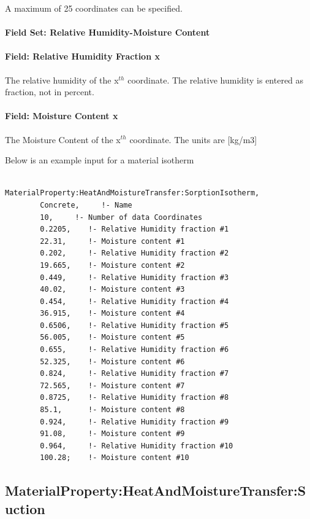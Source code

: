 A maximum of 25 coordinates can be specified.

\paragraph{Field Set: Relative Humidity-Moisture Content}\label{field-set-relative-humidity-moisture-content}

\paragraph{Field: Relative Humidity Fraction x}\label{field-relative-humidity-fraction-x}

The relative humidity of the x\(^{th}\) coordinate. The relative humidity is entered as fraction, not in percent.

\paragraph{Field: Moisture Content x}\label{field-moisture-content-x}

The Moisture Content of the x\(^{th}\) coordinate. The units are {[}kg/m3{]}

Below is an example input for a material isotherm

\begin{lstlisting}

MaterialProperty:HeatAndMoistureTransfer:SorptionIsotherm,
        Concrete,     !- Name
        10,     !- Number of data Coordinates
        0.2205,    !- Relative Humidity fraction #1
        22.31,     !- Moisture content #1
        0.202,     !- Relative Humidity fraction #2
        19.665,    !- Moisture content #2
        0.449,     !- Relative Humidity fraction #3
        40.02,     !- Moisture content #3
        0.454,     !- Relative Humidity fraction #4
        36.915,    !- Moisture content #4
        0.6506,    !- Relative Humidity fraction #5
        56.005,    !- Moisture content #5
        0.655,     !- Relative Humidity fraction #6
        52.325,    !- Moisture content #6
        0.824,     !- Relative Humidity fraction #7
        72.565,    !- Moisture content #7
        0.8725,    !- Relative Humidity fraction #8
        85.1,      !- Moisture content #8
        0.924,     !- Relative Humidity fraction #9
        91.08,     !- Moisture content #9
        0.964,     !- Relative Humidity fraction #10
        100.28;    !- Moisture content #10
\end{lstlisting}

\subsection{MaterialProperty:HeatAndMoistureTransfer:Suction}\label{materialpropertyheatandmoisturetransfersuction}

